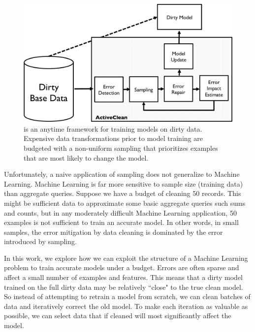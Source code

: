 \begin{figure}[t]
\centering
 \includegraphics[width=\columnwidth]{figs/arch.png}
 \caption{\sysfull is an anytime framework for training models on dirty data. Expensive data transformations prior to model training are budgeted with a non-uniform sampling that prioritizes examples that are most likely to change the model.  \label{sys-arch}}
\end{figure}

Unfortunately, a naive application of sampling does not generalize to Machine Learning.
Machine Learning is far more sensitive to sample size (training data) than aggregate queries.
Suppose we have a budget of cleaning 50 records.
This might be sufficient data to approximate some basic aggregate queries such sums and counts, but in any moderately difficult Machine Learning application, 50 examples is not sufficient to train an accurate model.
In other words, in small samples, the error mitigation by data cleaning is dominated by the error introduced by sampling.

In this work, we explore how we can exploit the structure of a Machine Learning problem to train accurate models under a budget.
Errors are often sparse and affect a small number of examples and features.
This means that a dirty model trained on the full dirty data may be relatively ``close" to the true clean model.
So instead of attempting to retrain a model from scratch, we can clean batches of data and iteratively correct the old model.
To make each iteration as valuable as possible, we can select data that if cleaned will most significantly affect the model.

